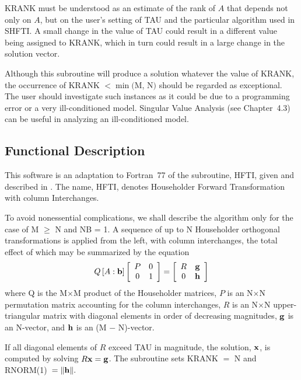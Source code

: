 \documentclass[twoside]{MATH77}
\begin{document}
KRANK must be understood as an estimate of the rank of $A$ that depends not
only on $A$, but on the user's setting of TAU and the particular algorithm
used in SHFTI. A small change in the value of TAU could result in a
different value being assigned to KRANK, which in turn could result in a
large change in the solution vector.

Although this subroutine will produce a solution whatever the value of
KRANK, the occurrence of KRANK $< \min (\text{M}$, N$)$ should be regarded
as exceptional. The user should investigate such instances as it could be
due to a programming error or a very ill-conditioned model. Singular Value
Analysis (see Chapter~4.3) can be useful in analyzing an ill-conditioned model.

\subsection{Functional Description}

This software is an adaptation to Fortran~77 of the subroutine, HFTI,
given and described in \cite{Lawson:1974:SLS}.  The name, HFTI, denotes
Householder Forward Transformation with column Interchanges.

To avoid nonessential complications, we shall describe the algorithm only
for the case of M $\geq $ N and NB = 1. A sequence of up to N Householder
orthogonal transformations is applied from the left, with column
interchanges, the total effect of which may be summarized by the equation%
\begin{equation*}
Q\left[ A:{\bf b}\right] \left[
\begin{array}{cc}
P & 0 \\
0 & 1
\end{array}
\right] =\left[
\begin{array}{cc}
R & {\bf g} \\ 0 & {\bf h}
\end{array}
\right]
\end{equation*}
where Q is the M$\times $M product of the Householder matrices, $P$ is an N$%
\times $N permutation matrix accounting for the column interchanges, $R$ is an
N$\times $N upper-triangular matrix with diagonal elements in order of
decreasing magnitudes, ${\bf g}$ is an N-vector, and ${\bf h}$ is an
(M $-$ N)-vector.

If all diagonal elements of $R$ exceed TAU in magnitude, the solution, ${\bf x}
$, is computed by solving $R{\bf x}={\bf g}$. The subroutine sets KRANK $=$
N and RNORM(1)\ $=\Vert {\bf h}\Vert .$
\end{document}

